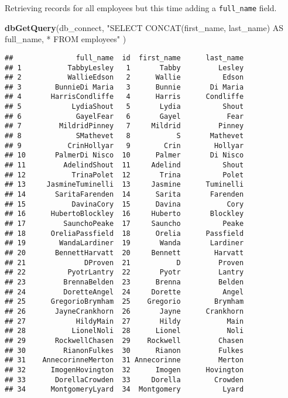 \documentclass[]{article}
\newenvironment{Shaded}{\begin{snugshade}}{\end{snugshade}}
\newcommand{\KeywordTok}[1]{\textcolor[rgb]{0.13,0.29,0.53}{\textbf{#1}}}
\newcommand{\NormalTok}[1]{#1}
\newcommand{\StringTok}[1]{\textcolor[rgb]{0.31,0.60,0.02}{#1}}
\begin{document}
Retrieving records for all employees but this time adding a
\texttt{full\_name} field.

\begin{Shaded}
\begin{Highlighting}[]
\KeywordTok{dbGetQuery}\NormalTok{(db_connect,}
\StringTok{"SELECT CONCAT(first_name, last_name) AS full_name,}
\StringTok{* FROM employees"}
\NormalTok{)}
\end{Highlighting}
\end{Shaded}

\begin{verbatim}
##               full_name  id  first_name      last_name
## 1           TabbyLesley   1       Tabby         Lesley
## 2           WallieEdson   2      Wallie          Edson
## 3        BunnieDi Maria   3      Bunnie       Di Maria
## 4       HarrisCondliffe   4      Harris      Condliffe
## 5            LydiaShout   5       Lydia          Shout
## 6             GayelFear   6       Gayel           Fear
## 7         MildridPinney   7     Mildrid         Pinney
## 8             SMathevet   8           S       Mathevet
## 9           CrinHollyar   9        Crin        Hollyar
## 10       PalmerDi Nisco  10      Palmer       Di Nisco
## 11         AdelindShout  11     Adelind          Shout
## 12           TrinaPolet  12       Trina          Polet
## 13     JasmineTuminelli  13     Jasmine      Tuminelli
## 14       SaritaFarenden  14      Sarita       Farenden
## 15           DavinaCory  15      Davina           Cory
## 16      HubertoBlockley  16     Huberto       Blockley
## 17         SaunchoPeake  17     Sauncho          Peake
## 18      OreliaPassfield  18      Orelia      Passfield
## 19        WandaLardiner  19       Wanda       Lardiner
## 20       BennettHarvatt  20     Bennett        Harvatt
## 21              DProven  21           D         Proven
## 22          PyotrLantry  22       Pyotr         Lantry
## 23         BrennaBelden  23      Brenna         Belden
## 24         DoretteAngel  24     Dorette          Angel
## 25      GregorioBrymham  25    Gregorio        Brymham
## 26       JayneCrankhorn  26       Jayne      Crankhorn
## 27            HildyMain  27       Hildy           Main
## 28           LionelNoli  28      Lionel           Noli
## 29       RockwellChasen  29    Rockwell         Chasen
## 30         RianonFulkes  30      Rianon         Fulkes
## 31    AnnecorinneMerton  31 Annecorinne         Merton
## 32      ImogenHovington  32      Imogen      Hovington
## 33       DorellaCrowden  33     Dorella        Crowden
## 34      MontgomeryLyard  34  Montgomery          Lyard

\end{verbatim}
\end{document}
